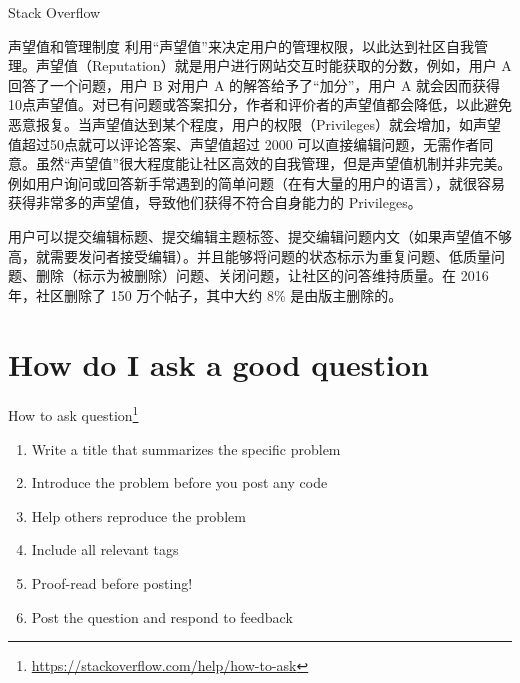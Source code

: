 \documentclass{beamer}
\begin{document}
\begin{frame}[t]{Stack Overflow}
     \begin{block}{声望值和管理制度}
		 \scriptsize
利用“声望值”来决定用户的管理权限，以此达到社区自我管理。声望值（Reputation）就是用户进行网站交互时能获取的分数，例如，用户 A 回答了一个问题，用户 B 对用户 A 的解答给予了“加分”，用户 A 就会因而获得10点声望值。对已有问题或答案扣分，作者和评价者的声望值都会降低，以此避免恶意报复。当声望值达到某个程度，用户的权限（Privileges）就会增加，如声望值超过50点就可以评论答案、声望值超过 2000 可以直接编辑问题，无需作者同意。虽然“声望值”很大程度能让社区高效的自我管理，但是声望值机制并非完美。例如用户询问或回答新手常遇到的简单问题（在有大量的用户的语言），就很容易获得非常多的声望值，导致他们获得不符合自身能力的 Privileges。

用户可以提交编辑标题、提交编辑主题标签、提交编辑问题内文（如果声望值不够高，就需要发问者接受编辑）。并且能够将问题的状态标示为重复问题、低质量问题、删除（标示为被删除）问题、关闭问题，让社区的问答维持质量。在 2016 年，社区删除了 150 万个帖子，其中大约 8\% 是由版主删除的。
     \end{block}
\end{frame}
\section{How do I ask a good question}
\begin{frame}[t]{How to ask question\footnote{\url{https://stackoverflow.com/help/how-to-ask}}}
	\begin{enumerate}
		\item Write a title that summarizes the specific problem
		\item Introduce the problem before you post any code
		\item Help others reproduce the problem
		\item Include all relevant tags
		\item Proof-read before posting!
		\item Post the question and respond to feedback
	\end{enumerate}
\end{frame}
\end{document}
